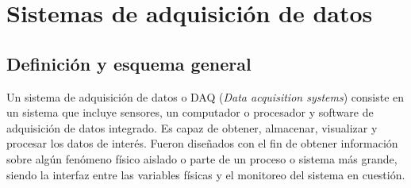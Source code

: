 \begin{table}[H]
    \centering
    \caption{Ventajas y desventajas de los enfoques de monitoreo.}
    \label{tab:monitoreo}
\end{table}


\section{Sistemas de adquisición de datos}

\subsection{Definición y esquema general} Un sistema de adquisición de datos o DAQ (\textit{Data acquisition systems})  consiste en un sistema que incluye sensores, un computador o procesador y software de adquisición de datos integrado. Es capaz de obtener, almacenar, visualizar y procesar los datos de interés. Fueron diseñados con el fin de obtener información sobre algún fenómeno físico aislado o parte de un proceso o sistema más grande, siendo la interfaz entre las variables físicas y el monitoreo del sistema en cuestión.

